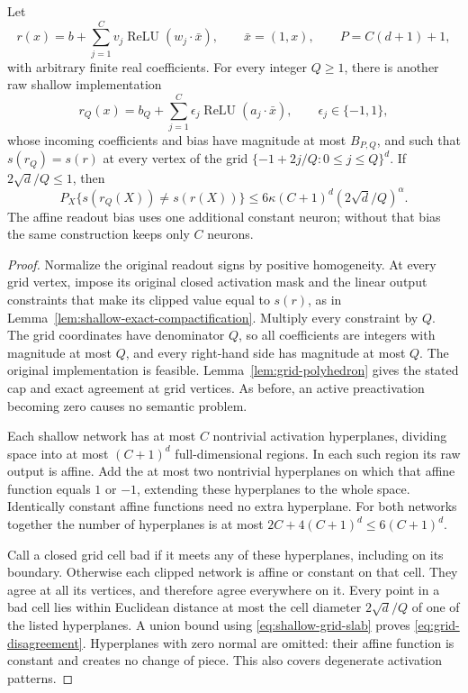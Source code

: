 \begin{lemma}
\label{lem:shallow-grid-compactification}
Let
\[
 r(x)=b+\sum_{j=1}^C v_j\operatorname{ReLU}(w_j\cdot\bar x),
 \qquad \bar x=(1,x),\qquad P=C(d+1)+1,
\]
with arbitrary finite real coefficients. For every integer $Q\ge1$, there is another raw shallow implementation
\[
 r_Q(x)=b_Q+\sum_{j=1}^C \epsilon_j
                 \operatorname{ReLU}(a_j\cdot\bar x),
 \qquad \epsilon_j\in\{-1,1\},
\]
whose incoming coefficients and bias have magnitude at most $B_{P,Q}$, and such that $s(r_Q)=s(r)$ at every vertex of the grid
$\{-1+2j/Q:0\le j\le Q\}^d$. If $2\sqrt d/Q\le1$, then
\begin{equation}
 P_X\{s(r_Q(X))\ne s(r(X))\}
 \le6\kappa(C+1)^d(2\sqrt d/Q)^\alpha.
 \label{eq:grid-disagreement}
\end{equation}
The affine readout bias uses one additional constant neuron; without that bias the same construction keeps only $C$ neurons.
\end{lemma}
\begin{proof}
Normalize the original readout signs by positive homogeneity. At every grid vertex, impose its original closed activation mask and the linear output constraints that make its clipped value equal to $s(r)$, as in Lemma~\ref{lem:shallow-exact-compactification}. Multiply every constraint by $Q$. The grid coordinates have denominator $Q$, so all coefficients are integers with magnitude at most $Q$, and every right-hand side has magnitude at most $Q$. The original implementation is feasible. Lemma~\ref{lem:grid-polyhedron} gives the stated cap and exact agreement at grid vertices. As before, an active preactivation becoming zero causes no semantic problem.

Each shallow network has at most $C$ nontrivial activation hyperplanes, dividing space into at most $(C+1)^d$ full-dimensional regions. In each such region its raw output is affine. Add the at most two nontrivial hyperplanes on which that affine function equals $1$ or $-1$, extending these hyperplanes to the whole space. Identically constant affine functions need no extra hyperplane. For both networks together the number of hyperplanes is at most
$2C+4(C+1)^d\le6(C+1)^d$.

Call a closed grid cell bad if it meets any of these hyperplanes, including on its boundary. Otherwise each clipped network is affine or constant on that cell. They agree at all its vertices, and therefore agree everywhere on it. Every point in a bad cell lies within Euclidean distance at most the cell diameter $2\sqrt d/Q$ of one of the listed hyperplanes. A union bound using \eqref{eq:shallow-grid-slab} proves \eqref{eq:grid-disagreement}. Hyperplanes with zero normal are omitted: their affine function is constant and creates no change of piece. This also covers degenerate activation patterns.
\end{proof}

